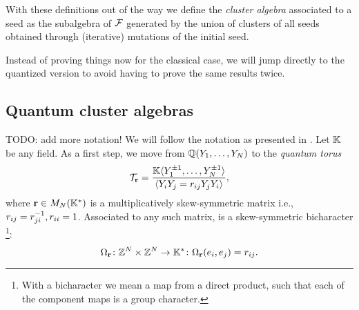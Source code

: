 \documentclass{article}
\begin{document}
\medskip

With these definitions out of the way we define the \emph{cluster algebra} associated to a seed
as the subalgebra of $\mathcal{F}$ generated by the union of clusters of all seeds
obtained through (iterative) mutations of the initial seed.

Instead of proving things now for the classical case,
we will jump directly to the quantized version to
avoid having to prove the same results twice.

\subsection{Quantum cluster algebras}

TODO: add more notation!
We will follow the notation as presented in \cite{GoodearlYakimov2017QCA}.
Let $\mathbb{K}$ be any field.
As a first step, we move from $\mathbb{Q}(Y_1, \dots, Y_N)$ to
the \emph{quantum torus}
\begin{equation*}
    \mathcal{T}_{\mathbf r} =
    \frac{\mathbb{K}\langle Y_1^{\pm 1}, \dots, Y_N^{\pm 1} \rangle}{\langle Y_iY_j = r_{ij}Y_jY_i \rangle},
\end{equation*}
where $\mathbf{r} \in M_N(\mathbb{K}^*)$ is a multiplicatively skew-symmetric matrix i.e.,
$r_{ij} = r_{ji}^{-1}, r_{ii} = 1$.
Associated to any such matrix, is a skew-symmetric bicharacter
\footnote{With a bicharacter we mean a map from a direct product,
    such that each of the component maps is a group character.}:
\begin{equation*}
    \Omega_{\mathbf{r}} \colon \mathbb{Z}^N \times \mathbb{Z}^N \to \mathbb{K}^* \colon
    \Omega_{\mathbf{r}}(e_i, e_j) = r_{ij}.
\end{equation*}
\end{document}
